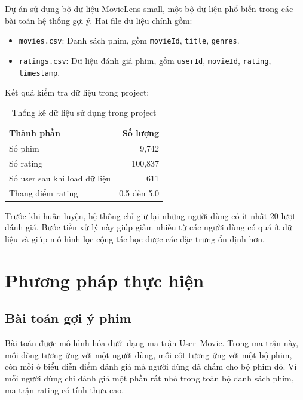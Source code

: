 \documentclass[12pt,a4paper]{article}
\begin{document}
Dự án sử dụng bộ dữ liệu MovieLens small, một bộ dữ liệu phổ biến trong các bài toán hệ thống gợi ý. Hai file dữ liệu chính gồm:

\begin{itemize}
    \item \texttt{movies.csv}: Danh sách phim, gồm \texttt{movieId}, \texttt{title}, \texttt{genres}.
    \item \texttt{ratings.csv}: Dữ liệu đánh giá phim, gồm \texttt{userId}, \texttt{movieId}, \texttt{rating}, \texttt{timestamp}.
\end{itemize}

Kết quả kiểm tra dữ liệu trong project:

\begin{table}[H]
    \centering
    \begin{tabular}{lr}
        \toprule
        \textbf{Thành phần} & \textbf{Số lượng} \\
        \midrule
        Số phim & 9,742 \\
        Số rating & 100,837 \\
        Số user sau khi load dữ liệu & 611 \\
        Thang điểm rating & 0.5 đến 5.0 \\
        \bottomrule
    \end{tabular}
    \caption{Thống kê dữ liệu sử dụng trong project}
\end{table}

Trước khi huấn luyện, hệ thống chỉ giữ lại những người dùng có ít nhất 20 lượt đánh giá. Bước tiền xử lý này giúp giảm nhiễu từ các người dùng có quá ít dữ liệu và giúp mô hình lọc cộng tác học được các đặc trưng ổn định hơn.

\section{Phương pháp thực hiện}

\subsection{Bài toán gợi ý phim}

Bài toán được mô hình hóa dưới dạng ma trận User--Movie. Trong ma trận này, mỗi dòng tương ứng với một người dùng, mỗi cột tương ứng với một bộ phim, còn mỗi ô biểu diễn điểm đánh giá mà người dùng đã chấm cho bộ phim đó. Vì mỗi người dùng chỉ đánh giá một phần rất nhỏ trong toàn bộ danh sách phim, ma trận rating có tính thưa cao.
\end{document}
